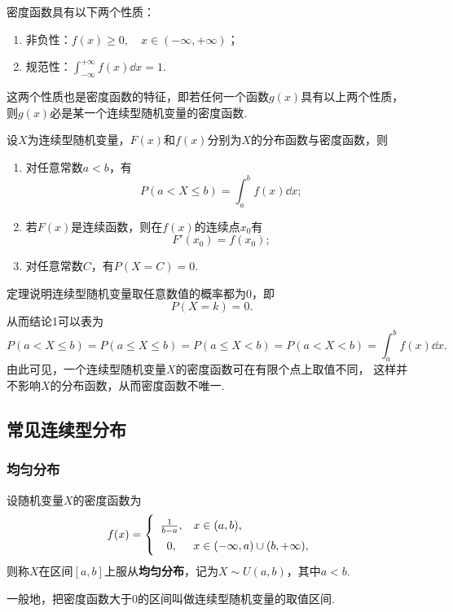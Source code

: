 \begin{property}\label{theorem:随机变量及其分布.连续型随机变量的密度函数的性质}
密度函数具有以下两个性质：
\begin{enumerate}
\item 非负性：\(f(x) \geqslant 0, \quad x \in (-\infty,+\infty)\)；
\item 规范性：\(\int_{-\infty}^{+\infty} f(x) \dd{x} = 1\).
\end{enumerate}
\rm
这两个性质也是密度函数的特征，即若任何一个函数\(g(x)\)具有以上两个性质，%
则\(g(x)\)必是某一个连续型随机变量的密度函数.
\end{property}

\begin{theorem}
设\(X\)为连续型随机变量，\(F(x)\)和\(f(x)\)分别为\(X\)的分布函数与密度函数，则
\begin{enumerate}
\item 对任意常数\(a < b\)，有\[
P(a < X \leqslant b) = \int_a^b{f(x) \dd{x}};
\]
\item 若\(F(x)\)是连续函数，则在\(f(x)\)的连续点\(x_0\)有\[
F'(x_0) = f(x_0);
\]
\item 对任意常数\(C\)，有\(P(X=C) = 0\).
\end{enumerate}
\end{theorem}

定理说明连续型随机变量取任意数值的概率都为0，即\[
P(X=k) = 0.
\]从而结论1可以表为\[
P(a < X \leqslant b)
= P(a \leqslant X \leqslant b)
= P(a \leqslant X < b)
= P(a < X < b)
= \int_a^b{f(x) \dd{x}}.
\]
由此可见，一个连续型随机变量\(X\)的密度函数可在有限个点上取值不同，%
这样并不影响\(X\)的分布函数，从而密度函数不唯一.

\subsection{常见连续型分布}

\subsubsection{均匀分布}
\begin{definition}
设随机变量\(X\)的密度函数为\begin{equation}
f(x) = \left\{ \def\arraystretch{1.5}
\begin{array}{cl}
\frac{1}{b-a}, & x \in (a,b), \\
0, & x \in (-\infty,a) \cup (b,+\infty), \\
\end{array} \right.
\end{equation}则称\(X\)在区间\([a,b]\)上服从\textbf{均匀分布}，记为\(X \sim U(a,b)\)，其中\(a < b\).

一般地，把密度函数大于0的区间叫做连续型随机变量的取值区间.
\end{definition}

